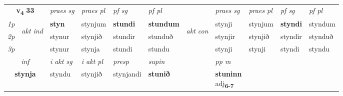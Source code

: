 \noindent
\begin{tabular}{lllllllllll} \toprule
\multicolumn{2}{c}{\textbf{v{\textsubscript{4}}} \Large{\textbf{33}}}  &  \textit{praes sg}  & \textit{praes pl}  &\textit{ pf sg} & \textit{pf pl} &  &  \textit{praes sg}  & \textit{praes pl}  & \textit{pf sg} & \textit{pf pl } \\*
	\cmidrule{3-6} \cmidrule{8-11}
 {\textit{1p}} & \multirow{3}{*}{\begin{turn}{90}\textit{akt ind}\end{turn}} & \textbf{styn} & stynjum & \textbf{stundi} & \textbf{stundum} & \multirow{3}{*}{\begin{turn}{90}\textit{akt con}\end{turn}} &stynji & stynjum & \textbf{styndi} & styndum\\*
 {\textit{2p}} &  &  stynur  & stynjið & stundir & stunduð & & stynjir & stynjið & styndir & stynduð \\*
{\textit{3p}} &  & stynur & stynja & stundi & stundu & & stynji & stynji& styndi & styndu \\*
\cmidrule{3-6} \cmidrule{8-11}

   \multicolumn{2}{c}{\textit{inf}}  & \textit{i akt sg} & \textit{i akt pl}   & \textit{presp} & \textit{supin}  && \textit{pp m} \\*
  \multicolumn{2}{c}{\textbf{stynja}} & styndu  & stynjið   & stynjandi &  \textbf{stunið}  && \specialcell{\textbf{stuninn} \\ adj\textbf{\textsubscript{6-7}}} \\*
\end{tabular}

